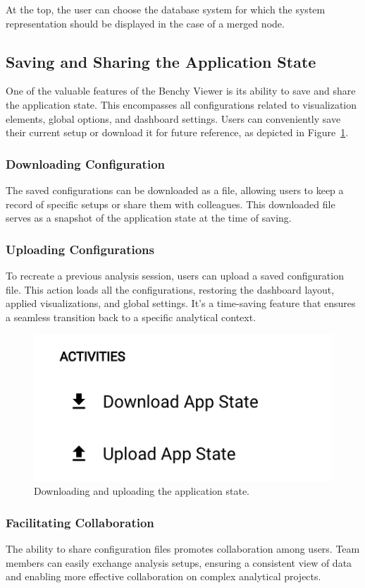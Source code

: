 At the top, the user can choose the database system for which the system representation should be displayed in the case of a merged node.


\subsection{Saving and Sharing the Application State}\label{sec:saving-sharing-state}

One of the valuable features of the Benchy Viewer is its ability to save and share the application state. This encompasses all configurations related to visualization elements, global options, and dashboard settings. Users can conveniently save their current setup or download it for future reference, as depicted in Figure~\ref{fig:save-upload}.

\subsubsection{Downloading Configuration}
The saved configurations can be downloaded as a file, allowing users to keep a record of specific setups or share them with colleagues. This downloaded file serves as a snapshot of the application state at the time of saving.

\subsubsection{Uploading Configurations}
To recreate a previous analysis session, users can upload a saved configuration file. This action loads all the configurations, restoring the dashboard layout, applied visualizations, and global settings. It's a time-saving feature that ensures a seamless transition back to a specific analytical context.


\begin{figure}[h]
  \vspace{0.5cm}
  \centering
  \includegraphics[width=0.4\linewidth]{figures/save-upload.png}
  \caption{Downloading and uploading the application state.}
  \label{fig:save-upload}
\end{figure}


\subsubsection{Facilitating Collaboration}
The ability to share configuration files promotes collaboration among users. Team members can easily exchange analysis setups, ensuring a consistent view of data and enabling more effective collaboration on complex analytical projects.

